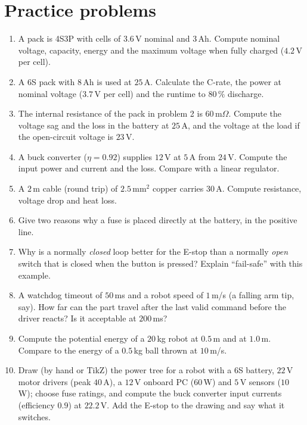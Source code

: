 \section*{Practice problems}
\begin{enumerate}[label=\textbf{\thechapter.\arabic*}]
  \item A pack is 4S3P with cells of $3.6$\,V nominal and $3$\,Ah. Compute nominal voltage, capacity, energy and the maximum voltage when fully charged ($4.2$\,V per cell).
  \item A 6S pack with $8$\,Ah is used at $25$\,A. Calculate the C-rate, the power at nominal voltage ($3.7$\,V per cell) and the runtime to $80\,\%$ discharge.
  \item The internal resistance of the pack in problem 2 is $60$\,m$\Omega$. Compute the voltage sag and the loss in the battery at $25$\,A, and the voltage at the load if the open-circuit voltage is $23$\,V.
  \item A buck converter ($\eta=0.92$) supplies $12$\,V at $5$\,A from $24$\,V. Compute the input power and current and the loss. Compare with a linear regulator.
  \item A $2$\,m cable (round trip) of $2.5$\,mm$^2$ copper carries $30$\,A. Compute resistance, voltage drop and heat loss.
  \item Give two reasons why a fuse is placed directly at the battery, in the positive line.
  \item Why is a normally \emph{closed} loop better for the E-stop than a normally \emph{open} switch that is closed when the button is pressed? Explain ``fail-safe'' with this example.
  \item A watchdog timeout of $50$\,ms and a robot speed of $1$\,m/s (a falling arm tip, say). How far can the part travel after the last valid command before the driver reacts? Is it acceptable at $200$\,ms?
  \item Compute the potential energy of a $20$\,kg robot at $0.5$\,m and at $1.0$\,m. Compare to the energy of a $0.5$\,kg ball thrown at $10$\,m/s.
  \item[\textbf{\thechapter.10}$\star$] Draw (by hand or TikZ) the power tree for a robot with a 6S battery, $22$\,V motor drivers (peak $40$\,A), a $12$\,V onboard PC ($60$\,W) and $5$\,V sensors ($10$\,W); choose fuse ratings, and compute the buck converter input currents (efficiency $0.9$) at $22.2$\,V. Add the E-stop to the drawing and say what it switches.
\end{enumerate}
